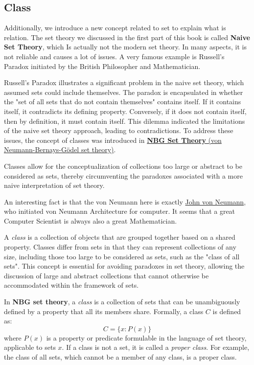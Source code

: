 \subsection{Class}
Additionally, we introduce a new concept related to set to explain what is relation.
The set theory we discussed in the first part of this book is called \textbf{Naive Set Theory}, which Is
actually not the modern set theory. In many aspects, it is not reliable and causes a lot of issues.
A very famous example is Russell's Paradox initiated by the British Philosopher and Mathematician.

Russell's Paradox illustrates a significant problem in the naive set theory, 
which assumed sets could include themselves. The paradox is encapsulated in whether the 
"set of all sets that do not contain themselves" contains itself. 
If it contains itself, it contradicts its defining property. Conversely, if it does not contain 
itself, then by definition, it must contain itself. This dilemma indicated the limitations 
of the naive set theory approach, leading to contradictions. To address these issues, the 
concept of classes was introduced in \href{https://www.wikiwand.com/en/Von_Neumann%E2%80%93Bernays%E2%80%93G%C3%B6del_set_theory}{\textbf{NBG Set Theory} (von Neumann-Bernays-Gödel set theory)}. 

Classes allow for the conceptualization of collections too large or abstract to be considered as sets, thereby circumventing the paradoxes 
associated with a more naive interpretation of set theory.
\begin{remark}
    An interesting fact is that the von Neumann here is exactly \href{https://www.wikiwand.com/en/John_von_Neumann}{John von Neumann},
    who initiated von Neumann Architecture for computer. It seems that a great Computer Scientist is always also a great Mathematician.
\end{remark}
\begin{definition}[Class]
    A \emph{class} is a collection of objects that are grouped together based on a shared property. 
    Classes differ from sets in that they can represent collections of any size, including 
    those too large to be considered as sets, such as the "class of all sets". 
    This concept is essential for avoiding paradoxes in set theory, 
    allowing the discussion of large and abstract collections that cannot 
    otherwise be accommodated within the framework of sets.
    
    In \textbf{NBG set theory}, a \emph{class} is a collection of sets that can be unambiguously defined by a property that all its members share. Formally, a class $C$ is defined as:
    $$
    C = \{ x : P(x) \}
    $$
    where $P(x)$ is a property or predicate formulable in the language of set theory, applicable to sets $x$. If a class is not a set, it is called a \emph{proper class}. For example, the class of all sets, which cannot be a member of any class, is a proper class.
\end{definition}

